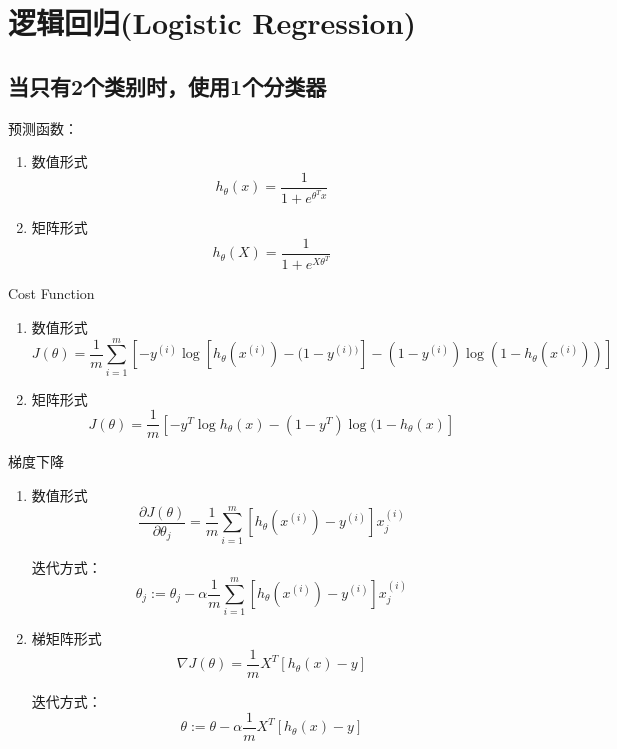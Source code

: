 \section{逻辑回归(Logistic Regression)}

\subsection{当只有2个类别时，使用1个分类器}
预测函数：
\begin{enumerate}
\item 数值形式
\begin{equation}
	h_\theta(x) = \frac{1}{1 + e^{\theta^T x}}
\end{equation}

\item 矩阵形式
\begin{equation}
	h_\theta(X) = \frac{1}{1 + e^{X \theta^T}}
\end{equation}
\end{enumerate}


Cost Function
\begin{enumerate}
\item 数值形式
\begin{equation}
	J(\theta) = \frac{1}{m} 
	    \sum_{i=1}^m {[ -y^{(i)} \log{[h_\theta{(x^{(i)})} - (1-y^{(i))}]} - (1-y^{(i)})\log(1-h_\theta(x^{(i)}))]}
\end{equation}

\item 矩阵形式
\begin{equation}
		J(\theta) = \frac{1}{m} [-y^T \log{h_\theta(x)} - (1-y^T) \log{(1-h_\theta(x)}]
\end{equation}
\end{enumerate}



梯度下降
\begin{enumerate}
\item 数值形式
\begin{equation}
	\frac{\partial J(\theta)}{\partial \theta_j} =
	    \frac{1}{m} \sum_{i=1}^m [h_\theta(x^{(i)}) - y^{(i)}] x_j^{(i)}
\end{equation}

迭代方式：
\begin{equation}
	\theta_j :=
	    \theta_j - \alpha \frac{1}{m} \sum_{i=1}^m [h_\theta(x^{(i)}) - y^{(i)}] x_j^{(i)}
\end{equation}

\item 梯矩阵形式
\begin{equation}
	\nabla J(\theta) = \frac{1}{m} X^T [h_\theta(x) - y]
\end{equation}

迭代方式：
\begin{equation}
	\theta := \theta - \alpha \frac{1}{m} X^T [h_\theta(x) - y]
\end{equation}
\end{enumerate}



